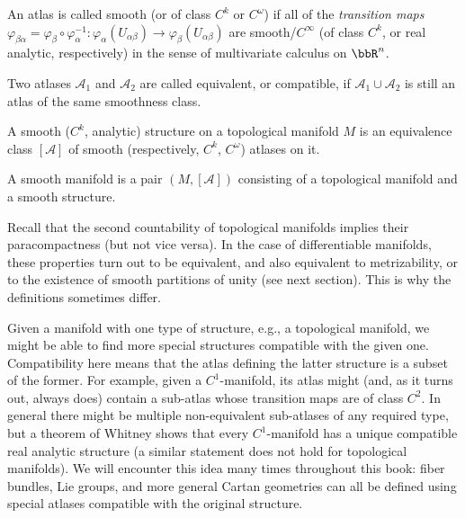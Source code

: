 \begin{defn}
    An atlas is called smooth (or of class $C^k$ or $C^\omega$) if all of the \emph{transition maps} $\varphi_{\beta\alpha}=\varphi_\beta\circ\varphi_\alpha^{-1}:\varphi_\alpha(U_{\alpha\beta})\to\varphi_\beta(U_{\alpha\beta})$ are smooth/$C^\infty$ (of class $C^k$, or real analytic, respectively) in the sense of multivariate calculus on $\bbR^n$.
\end{defn}
\begin{defn}
    Two atlases $\mathcal{A}_1$ and $\mathcal{A}_2$ are called equivalent, or compatible, if $\mathcal{A}_1\cup\mathcal{A}_2$ is still an atlas of the same smoothness class.
\end{defn}
\begin{defn}
    A smooth ($C^k$, analytic) structure on a topological manifold $M$ is an equivalence class $[\mathcal{A}]$ of smooth (respectively, $C^k$, $C^\omega$) atlases on it. 
\end{defn}
\begin{defn}
    A smooth manifold is a pair $(M,[\mathcal{A}])$ consisting of a topological manifold and a smooth structure.
\end{defn}

\begin{rem}
    Recall that the second countability of topological manifolds implies their paracompactness (but not vice versa). In the case of differentiable manifolds, these properties turn out to be equivalent, and also equivalent to metrizability, or to the existence of smooth partitions of unity (see next section). This is why the definitions sometimes differ.
\end{rem}

\begin{rem}
    Given a manifold with one type of structure, e.g., a topological manifold, we might be able to find more special structures compatible with the given one. Compatibility here means that the atlas defining the latter structure is a subset of the former. For example, given a $C^1$-manifold, its atlas might (and, as it turns out, always does) contain a sub-atlas whose transition maps are of class $C^2$. In general there might be multiple non-equivalent sub-atlases of any required type, but a theorem of Whitney shows that every $C^1$-manifold has a unique compatible real analytic structure (a similar statement does not hold for topological manifolds). We will encounter this idea many times throughout this book: fiber bundles, Lie groups, and more general Cartan geometries can all be defined using special atlases compatible with the original structure.
\end{rem}

